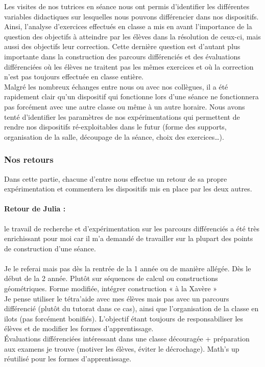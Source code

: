 Les visites de nos tutrices en séance nous ont permis d'identifier les différentes variables didactiques sur lesquelles nous pouvons différencier dans nos dispositifs. Ainsi, l'analyse d'exercices effectués en classe a mis en avant l'importance de la question des objectifs à atteindre par les élèves dans la résolution de ceux-ci, mais aussi des objectifs leur correction. Cette dernière question est d'autant plus importante dans la construction des parcours différenciés et des évaluations différenciées où les élèves ne traitent pas les mêmes exercices et où la correction n'est pas toujours effectuée en classe entière.\\
Malgré les nombreux échanges entre nous ou avec nos collègues, il a été rapidement clair qu'un dispositif qui fonctionne lors d'une séance ne fonctionnera pas forcément avec une autre classe ou même à un autre horaire. Nous avons tenté d'identifier les paramètres de nos expérimentations qui permettent de rendre nos dispositifs ré-exploitables dans le futur (forme des supports, organisation de la salle, découpage de la séance, choix des exercices\ldots).

\subsubsection{Nos retours}\label{sec:retours}
Dans cette partie, chacune d'entre nous effectue un retour de sa propre expérimentation et commentera les dispositifs mis en place par les deux autres. \\
\paragraph*{Retour de Julia :}
le travail de recherche et d'expérimentation sur les parcours différenciés a été très enrichissant pour moi car il m'a demandé de travailler sur la plupart des points de construction d'une séance. \\
\\
Je le referai mais pas dès la rentrée de la 1 année ou de manière allégée. Dès le début de la 2 année. Plutôt sur séquences de calcul ou constructions géométriques. Forme modifiée, intégrer construction « à la Xavère »\\
Je pense utiliser le tétra'aide avec mes élèves mais pas avec un parcours différencié (plutôt du tutorat dans ce cas), ainsi que l'organisation de la classe en ilots (pas forcément bonifiés). L'objectif étant toujours de responsabiliser les élèves et de modifier les formes d'apprentissage.\\
Évaluations différenciées intéressant dans une classe découragée + préparation aux examens je trouve (motiver les élèves, éviter le décrochage).
Math's up réutilisé pour les formes d'apprentissage.

